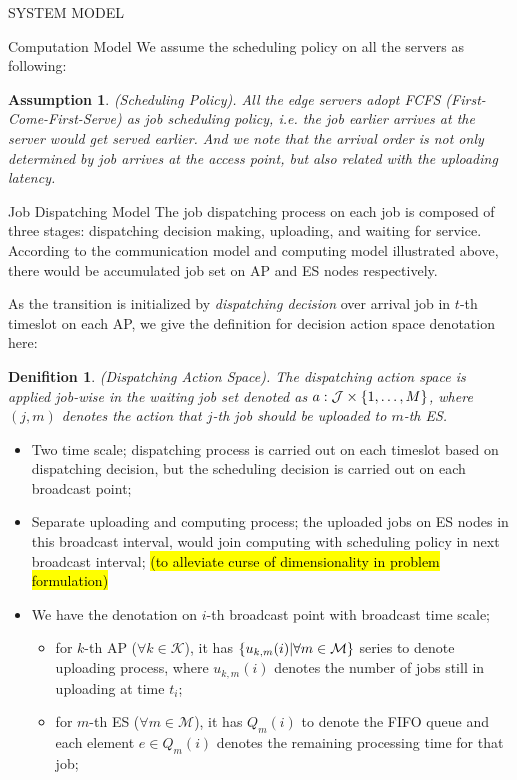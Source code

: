 \documentclass[10pt, conference, letterpaper]{IEEEtran}
\newtheorem{definition}{Denifition}
\newtheorem{assumption}{Assumption}
\DeclarePairedDelimiter{\set}{\{}{\}}
\newcommand{\apSet}{\mathcal{K}}
\newcommand{\esSet}{\mathcal{M}}
\newcommand{\jSet}{\mathcal{J}}
\begin{document}
\begin{section}{SYSTEM MODEL}
\begin{subsection}{Computation Model}
            We assume the scheduling policy on all the servers as following:
            \begin{assumption}
                (Scheduling Policy).
                All the edge servers adopt \emph{FCFS} (First-Come-First-Serve) as job scheduling policy, i.e. the job earlier arrives at the server would get served earlier. And we note that the arrival order is not only determined by job arrives at the access point, but also related with the uploading latency.
            \end{assumption}
        \end{subsection}

        \begin{subsection}{Job Dispatching Model}
            The job dispatching process on each job is composed of three stages: dispatching decision making, uploading, and waiting for service. According to the communication model and computing model illustrated above, there would be accumulated job set on AP and ES nodes respectively.

            As the transition is initialized by \emph{dispatching decision} over arrival job in $t$-th timeslot on each AP, we give the definition for decision action space denotation here:
            \begin{definition}
                (Dispatching Action Space).
                The dispatching action space is applied job-wise in the waiting job set denoted as $a: \jSet \times \set{1,\dots,M}$, where $(j, m)$ denotes the action that $j$-th job should be uploaded to $m$-th ES.
            \end{definition}

            \begin{itemize}
                \item Two time scale; dispatching process is carried out on each timeslot based on dispatching decision, but the scheduling decision is carried out on each broadcast point;
                \item Separate uploading and computing process; the uploaded jobs on ES nodes in this broadcast interval, would join computing with scheduling policy in next broadcast interval; \hl{(to alleviate curse of dimensionality in problem formulation)}
                \item We have the denotation on $i$-th broadcast point with broadcast time scale;
                    \begin{itemize}
                        \item for $k$-th AP ($\forall k\in\apSet$), it has $\set{u_{k,m}(i)|\forall m\in\esSet}$ series to denote uploading process, where $u_{k,m}(i)$ denotes the number of jobs still in uploading at time $t_i$;
                        \item for $m$-th ES ($\forall m\in\esSet$), it has $Q_m(i)$ to denote the FIFO queue and each element $e \in Q_m(i)$ denotes the remaining processing time for that job;
                    \end{itemize}
            \end{itemize}


\end{subsection}
\end{section}
\end{document}
